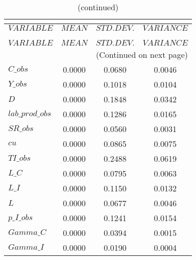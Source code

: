  
\begin{center}
\begin{longtable}{lccc} 
\caption{THEORETICAL MOMENTS}\\
 \label{Table:th_moments}\\
\toprule 
$VARIABLE        $	 & 	 $         MEAN$	 & 	 $    STD. DEV.$	 & 	 $     VARIANCE$\\
\midrule \endfirsthead 
\caption{(continued)}\\
 \toprule \\ 
$VARIABLE        $	 & 	 $         MEAN$	 & 	 $    STD. DEV.$	 & 	 $     VARIANCE$\\
\midrule \endhead 
\midrule \multicolumn{4}{r}{(Continued on next page)} \\ \bottomrule \endfoot 
\bottomrule \endlastfoot 
$C\_obs          $	 & 	       0.0000	 & 	       0.0680	 & 	       0.0046 \\ 
$Y\_obs          $	 & 	       0.0000	 & 	       0.1018	 & 	       0.0104 \\ 
$D               $	 & 	       0.0000	 & 	       0.1848	 & 	       0.0342 \\ 
$lab\_prod\_obs  $	 & 	       0.0000	 & 	       0.1286	 & 	       0.0165 \\ 
$SR\_obs         $	 & 	       0.0000	 & 	       0.0560	 & 	       0.0031 \\ 
$cu              $	 & 	       0.0000	 & 	       0.0865	 & 	       0.0075 \\ 
$TI\_obs         $	 & 	       0.0000	 & 	       0.2488	 & 	       0.0619 \\ 
$L\_C            $	 & 	       0.0000	 & 	       0.0795	 & 	       0.0063 \\ 
$L\_I            $	 & 	       0.0000	 & 	       0.1150	 & 	       0.0132 \\ 
$L               $	 & 	       0.0000	 & 	       0.0677	 & 	       0.0046 \\ 
$p\_I\_obs       $	 & 	       0.0000	 & 	       0.1241	 & 	       0.0154 \\ 
$Gamma\_C        $	 & 	       0.0000	 & 	       0.0394	 & 	       0.0015 \\ 
$Gamma\_I        $	 & 	       0.0000	 & 	       0.0190	 & 	       0.0004 \\ 
\end{longtable}
 \end{center}
